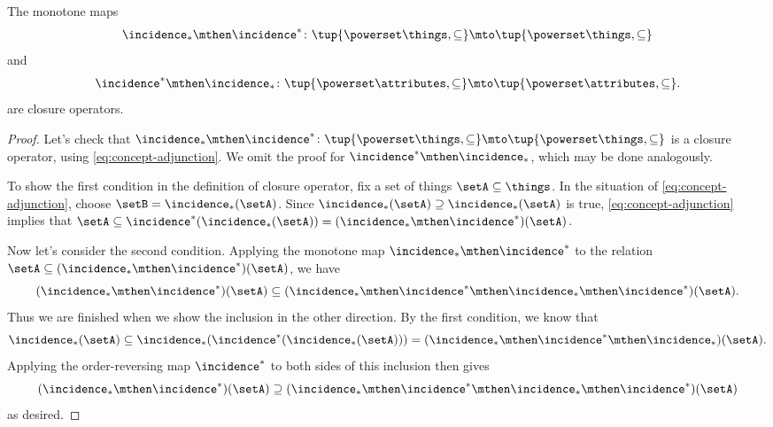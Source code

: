 \begin{lemma}
The monotone maps 
\begin{equation}
\incidence_* \mthen \incidence^* \colon \tup{\powerset \things, \subseteq} \mto \tup{\powerset \things, \subseteq}
\end{equation}
and 
\begin{equation}
\incidence^* \mthen \incidence_* \colon \tup{\powerset \attributes, \subseteq} \mto \tup{\powerset \attributes, \subseteq}.
\end{equation}
are closure operators. 
\end{lemma}

\begin{proof}
Let's check that $\incidence_* \mthen \incidence^* \colon \tup{\powerset \things, \subseteq} \mto \tup{\powerset \things, \subseteq}$ is a closure operator, using \cref{eq:concept-adjunction}. We omit the proof for $\incidence^* \mthen \incidence_*$, which may be done analogously. 


To show the first condition in the definition of closure operator, fix a set of things $\setA \subseteq \things$. In the situation of \cref{eq:concept-adjunction}, choose $\setB = \incidence_*(\setA)$. Since $\incidence_*(\setA) \supseteq \incidence_*(\setA)$ is true, \cref{eq:concept-adjunction} implies that $\setA \subseteq \incidence^*(\incidence_*(\setA))  = (\incidence_* \mthen \incidence^*)(\setA)$. 

Now let's consider the second condition. Applying the monotone map $\incidence_* \mthen \incidence^*$ to the relation $\setA \subseteq (\incidence_* \mthen \incidence^*)(\setA)$, we have
\begin{equation}
(\incidence_* \mthen \incidence^*)(\setA)  \subseteq  (\incidence_* \mthen \incidence^* \mthen \incidence_* \mthen \incidence^*)(\setA).
\end{equation}
Thus we are finished when we show the inclusion in the other direction. By the first condition, we know that 
\begin{equation}
\incidence_*(\setA) \subseteq \incidence_*( \incidence^* (\incidence_*(\setA))) = (\incidence_* \mthen \incidence^* \mthen \incidence_*)(\setA).
\end{equation}
Applying the order-reversing map $\incidence^*$ to both sides of this inclusion then gives 
\begin{equation}
(\incidence_* \mthen \incidence^*)(\setA) \supseteq (\incidence_* \mthen \incidence^* \mthen \incidence_* \mthen \incidence^*)(\setA)
\end{equation}
as desired. 
\end{proof}

